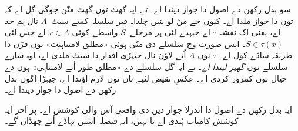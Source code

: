 \documentclass[../../../include/open-logic-section]{subfiles}
\begin{document}
سو \stagescofin{} بدل رکھن دے اصول دا جواز دیندا اے۔ تے ایہ گھٹ توں گھٹ منّن جوگی گل اے کہ \stagesinex{} توں \stagescofin دا جواز ملدا اے۔ کیوں جے منّ لو \stagescofin{} نئیں چلدا۔ فیر سلسلہ کسے سیٹ~$A$ نال ہم حد اے، یعنی اک نقشہ $\tau$ اے جیہدے لئی ہر مرحلے~$S$ واسطے کوئی $x \in A$ اے جس لئی $S \in \tau(x)$۔ ایس صورت وچ سلسلے دی منّی ہوئی «مطلق لامتناہیت» نوں فڑن دا طریقہ ساڈے کول اے۔ $\tau$ نوں $A$ اُتے لاؤن نال جیہڑی اقدار دا سیٹ ملدی اے، اوہ سارے سلسلے نوں \emph{گھیر لیندا اے}۔ تے ایہ گل سلسلے دے «مطلق طور اُتے لامتناہی» ہون دے خیال نوں کمزور کردی اے۔ عکسِ نقیض لئیے تاں \stagesinex{} توں \stagescofin لازم آؤندا اے، جیہڑا اگوں بدل رکھن دے اصول دا جواز دیندا اے۔

ایہ بدل رکھن دے اصول دا اندرلا جواز دین دی واقعی آس والی کوشش اے۔ پر آخر ایہ کوشش کامیاب ہُندی اے یا نہیں، ایہ فیصلہ اسیں تہاڈے اُتے چھڈاں گے۔
\end{document}
